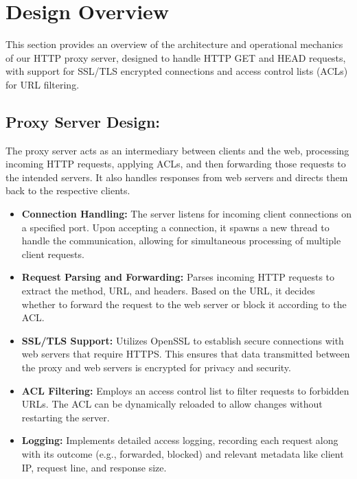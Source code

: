 \documentclass{article}
\begin{document}
\section*{Design Overview}
This section provides an overview of the architecture and operational mechanics of our HTTP proxy server, designed to handle HTTP GET and HEAD requests, with support for SSL/TLS encrypted connections and access control lists (ACLs) for URL filtering.

\subsection*{Proxy Server Design:}
The proxy server acts as an intermediary between clients and the web, processing incoming HTTP requests, applying ACLs, and then forwarding those requests to the intended servers. It also handles responses from web servers and directs them back to the respective clients.

\begin{itemize}
    \item \textbf{Connection Handling:} The server listens for incoming client connections on a specified port. Upon accepting a connection, it spawns a new thread to handle the communication, allowing for simultaneous processing of multiple client requests.
    
    \item \textbf{Request Parsing and Forwarding:} Parses incoming HTTP requests to extract the method, URL, and headers. Based on the URL, it decides whether to forward the request to the web server or block it according to the ACL.
    
    \item \textbf{SSL/TLS Support:} Utilizes OpenSSL to establish secure connections with web servers that require HTTPS. This ensures that data transmitted between the proxy and web servers is encrypted for privacy and security.
    
    \item \textbf{ACL Filtering:} Employs an access control list to filter requests to forbidden URLs. The ACL can be dynamically reloaded to allow changes without restarting the server.
    
    \item \textbf{Logging:} Implements detailed access logging, recording each request along with its outcome (e.g., forwarded, blocked) and relevant metadata like client IP, request line, and response size.
\end{itemize}
\end{document}
